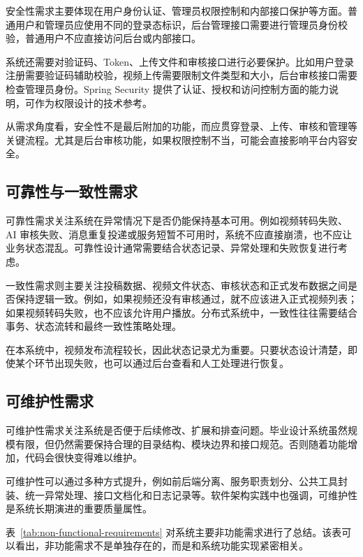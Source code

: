 安全性需求主要体现在用户身份认证、管理员权限控制和内部接口保护等方面。普通用户和管理员应使用不同的登录态标识，后台管理接口需要进行管理员身份校验，普通用户不应直接访问后台或内部接口。

系统还需要对验证码、Token、上传文件和审核接口进行必要保护。比如用户登录注册需要验证码辅助校验，视频上传需要限制文件类型和大小，后台审核接口需要检查管理员身份。Spring Security 提供了认证、授权和访问控制方面的能力说明，可作为权限设计的技术参考\cite{springsecuritydocs}。

从需求角度看，安全性不是最后附加的功能，而应贯穿登录、上传、审核和管理等关键流程。尤其是后台审核功能，如果权限控制不当，可能会直接影响平台内容安全。

\subsection{可靠性与一致性需求}
\label{subsec:reliability-consistency-requirements}

可靠性需求关注系统在异常情况下是否仍能保持基本可用。例如视频转码失败、AI 审核失败、消息重复投递或服务短暂不可用时，系统不应直接崩溃，也不应让业务状态混乱。可靠性设计通常需要结合状态记录、异常处理和失败恢复进行考虑。

一致性需求则主要关注投稿数据、视频文件状态、审核状态和正式发布数据之间是否保持逻辑一致。例如，如果视频还没有审核通过，就不应该进入正式视频列表；如果视频转码失败，也不应该允许用户播放。分布式系统中，一致性往往需要结合事务、状态流转和最终一致性策略处理\cite{kleppmann2017ddia}。

在本系统中，视频发布流程较长，因此状态记录尤为重要。只要状态设计清楚，即使某个环节出现失败，也可以通过后台查看和人工处理进行恢复。

\subsection{可维护性需求}
\label{subsec:maintainability-requirements}

可维护性需求关注系统是否便于后续修改、扩展和排查问题。毕业设计系统虽然规模有限，但仍然需要保持合理的目录结构、模块边界和接口规范。否则随着功能增加，代码会很快变得难以维护。

可维护性可以通过多种方式提升，例如前后端分离、服务职责划分、公共工具封装、统一异常处理、接口文档化和日志记录等。软件架构实践中也强调，可维护性是系统长期演进的重要质量属性\cite{bass2021softwarearchitecture}。

表~\ref{tab:non-functional-requirements} 对系统主要非功能需求进行了总结。该表可以看出，非功能需求不是单独存在的，而是和系统功能实现紧密相关。

